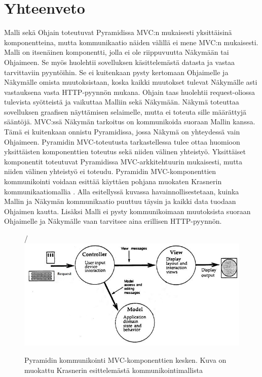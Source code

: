 \documentclass[utf8]{gradu3}
\begin{document}
\section{Yhteenveto}
Malli sekä Ohjain toteutuvat Pyramidissa MVC:n mukaisesti yksittäisinä komponentteina, mutta kommunikaatio näiden välillä ei mene MVC:n mukaisesti. Malli on itsenäinen komponentti, jolla ei ole riippuvuutta Näkymään tai Ohjaimeen. Se myös huolehtii sovelluksen käsittelemästä datasta ja vastaa tarvittaviin pyyntöihin. Se ei kuitenkaan pysty kertomaan Ohjaimelle ja Näkymälle omista muutoksistaan, koska kaikki muutokset tulevat Näkymälle asti vastauksena vasta HTTP-pyynnön mukana. Ohjain taas huolehtii request-oliossa tulevista syötteistä ja vaikuttaa Malliin sekä Näkymään. Näkymä toteuttaa sovelluksen graafisen näyttämisen selaimelle, mutta ei toteuta sille määrättyjä sääntöjä. MVC:ssä Näkymän tarkoitus on kommunikoida suoraan Mallin kanssa. Tämä ei kuitenkaan onnistu Pyramidissa, jossa Näkymä on yhteydessä vain Ohjaimeen. Pyramidin MVC-toteutusta tarkastellessa tulee ottaa huomioon yksittäisten komponenttien toteutus sekä niiden välinen yhteistyö. Yksittäiset komponentit toteutuvat Pyramidissa MVC-arkkitehtuurin mukaisesti, mutta niiden välinen yhteistyö ei toteudu. Pyramidin MVC-komponenttien kommunikointi voidaan esittää käyttäen pohjana muokaten Krasnerin kommunikaatiomallia \parencite{krasner_desc}.
Alla esitellyssä kuvassa havainnollisestetaan, kuinka Mallin ja Näkymän kommunikaatio puuttuu täysin ja kaikki data tuodaan Ohjaimen kautta. Lisäksi Malli ei pysty kommunikoimaan muutoksista suoraan Ohjaimelle ja Näkymälle vaan tarvitsee aina erillisen HTTP-pyynnön.

\begin{figure}[h]
\centering/
\includegraphics[scale=0.85]{pyramid_mvc.jpg}
\caption{Pyramidin kommunikointi MVC-komponenttien kesken. Kuva on muokattu Krasnerin esittelemästä kommunikointimallista \parencite{krasner_desc} }
\end{figure}
\end{document}
